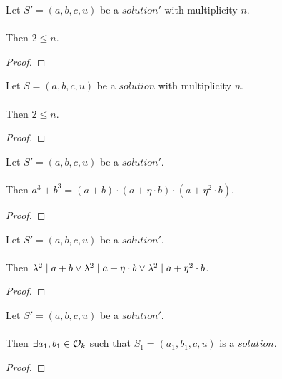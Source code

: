 \begin{lemma}
    \label{lmm:Solution1.two_le_multiplicity}
    \leanok
    Let $S'=(a, b, c, u)$ be a $solution'$ with multiplicity $n$.\\\\
    Then $2 \leq n$.
\end{lemma}
\begin{proof}
    \leanok
\end{proof}

\begin{lemma}
    \label{lmm:Solution.two_le_multiplicity}
    \leanok
    Let $S=(a, b, c, u)$ be a $solution$ with multiplicity $n$.\\\\
    Then $2 \leq n$.
\end{lemma}
\begin{proof}
    \leanok
\end{proof}

\begin{lemma}
    \label{lmm:cube_add_cube_eq_mul}
    \leanok
    Let $S'=(a, b, c, u)$ be a $solution'$.\\\\
    Then $a^3 + b^3 = (a + b) \cdot (a + \eta \cdot b) \cdot (a + \eta^2 \cdot b)$.
\end{lemma}
\begin{proof}
    \leanok
\end{proof}

\begin{lemma}
    \label{lmm:lambda_sq_dvd_or_dvd_or_dvd}
    \leanok
    Let $S'=(a, b, c, u)$ be a $solution'$.\\\\
    Then $\lambda^2 \mid a + b \lor \lambda^2 \mid a +
    \eta \cdot b \lor \lambda^2 \mid a + \eta^2 \cdot b$.
\end{lemma}
\begin{proof}
    \leanok
\end{proof}

\begin{lemma}
    \label{lmm:ex_dvd_a_add_b}
    \leanok
    Let $S'=(a, b, c, u)$ be a $solution'$.\\\\
    Then $\exists a_1,b_1 \in \mathcal{O}_k$ such that $S_1=(a_1,b_1,c,u)$ is a $solution$.
\end{lemma}
\begin{proof}
    \leanok
\end{proof}

